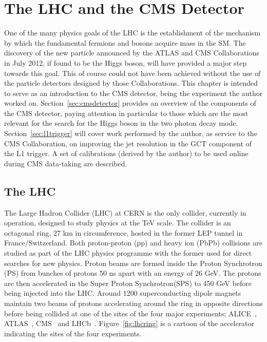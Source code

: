 \chapter{The LHC and the CMS Detector}
\label{chap:detector}

One of the many physics goals of the LHC is the establishment of the mechanism by which 
the fundamental fermions and bosons acquire mass in the SM. The discovery of the new particle 
announced by the ATLAS and CMS Collaborations in July 2012, if found to be the Higgs boson, will have provided 
a major step towards this goal. This of course could not have been achieved without the use
of the particle detectors designed by those Collaborations. This chapter is intended to serve as an 
introduction to the CMS detector, being the experiment the author worked on. Section~\ref{sec:cmsdetector}
provides an overview of the components of the CMS detector, paying attention in particular to those 
which are the most relevant for the search for the Higgs boson in the two photon decay mode. 
Section~\ref{sec:l1trigger} will cover work performed by the author, as service to the CMS Collaboration, 
on improving the jet resolution in the GCT component of the L1 trigger. A set of calibrations (derived by 
the author) to be used online during CMS data-taking are described.

\section{The LHC}
The Large Hadron Collider (LHC) at CERN is the only collider, currently in operation, 
designed to study physics at the TeV scale. The collider is an octagonal 
ring, 27 km in circumference, hosted in the former LEP tunnel in France/Switzerland.  
Both proton-proton (pp) and heavy ion (PbPb) collisions are
studied as part of the LHC physics programme with the former used 
for direct searches for new physics. Proton beams are formed inside the Proton Synchrotron (PS)
from bunches of protons 50 ns apart with an energy of 26 GeV. The protons are then accelerated in the 
Super Proton Synchrotron(SPS) to 450 GeV before being injected into the LHC. 
Around 1200 superconducting dipole magnets maintain two beams of protons accelerating around 
the ring in opposite directions before being collided at one of the sites of the four major experiments;
ALICE~\citep{aliceexperiment}, ATLAS~\citep{atlasexperiment}, CMS~\citep{cmsexperiment}
and LHCb~\citep{lhcbexperiment}. Figure~\ref{fig:lhcring} is a cartoon of the accelerator 
indicating the sites of the four experiments.

